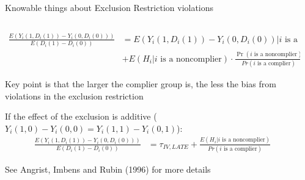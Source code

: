 \documentclass[notes,11pt, aspectratio=169]{beamer}
\newenvironment{wideitemize}{\itemize\addtolength{\itemsep}{10pt}}{\enditemize}
\begin{document}
\begin{frame}{Knowable things about Exclusion Restriction violations}
  \begin{columns}[T] %
    \begin{column}{0.99\textwidth}
          \begin{align*}
            \frac{E(Y_{i}(1, D_{i}(1)) - Y_{i}(0, D_{i}(0)))}{E(D_{i}(1) - D_{i}(0))} &= E(Y_{i}(1, D_{i}(1)) -  Y_{i}(0, D_{i}(0)) | \text{$i$ is a complier})\\
            &+ E(H_{i} | \text{$i$ is a noncomplier}) \cdot \frac{\Pr(\text{$i$ is a noncomplier})}{Pr(\text{$i$ is a complier})}
          \end{align*}
          \begin{wideitemize}
          \item Key point is that the larger the complier group is,
            the less the bias from violations in the exclusion restriction
          \item If the effect of the exclusion is additive
            ($Y_{i}(1,0) - Y_{i}(0,0) = Y_{i}(1,1) - Y_{i}(0,1)$):
          \begin{align*}
            \frac{E(Y_{i}(1, D_{i}(1)) - Y_{i}(0, D_{i}(0)))}{E(D_{i}(1) - D_{i}(0))} &= \tau_{IV,LATE} +  \frac{E(H_{i} | \text{$i$ is a noncomplier})}{Pr(\text{$i$ is a complier})}
          \end{align*}
          \item See Angrist, Imbens and Rubin (1996) for more details
      \end{wideitemize}
\end{column}
\begin{column}{0.4\textwidth}
\end{column}
\end{columns}
\end{frame}
\end{document}
